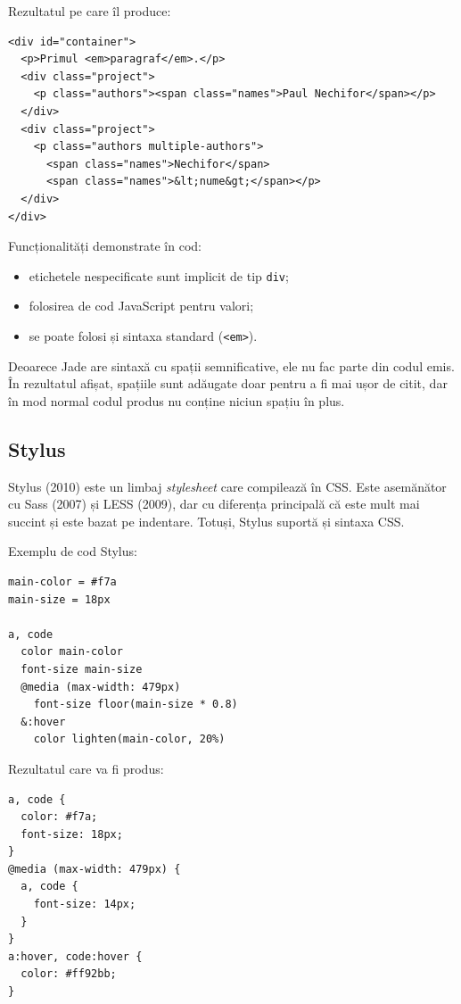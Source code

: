 \documentclass[a4wide,12pt]{report}
\newcommand{\eng}[1]{\emph{#1}} %
\newcommand{\cod}[1]{\texttt{#1}}
\newcommand{\acr}[1]{{\textsmaller[1]{\textsc{#1}}}} %
\begin{document}
Rezultatul pe care îl produce:

\begin{verbatim}
<div id="container">
  <p>Primul <em>paragraf</em>.</p>
  <div class="project">
    <p class="authors"><span class="names">Paul Nechifor</span></p>
  </div>
  <div class="project">
    <p class="authors multiple-authors">
      <span class="names">Nechifor</span>
      <span class="names">&lt;nume&gt;</span></p>
  </div>
</div>
\end{verbatim}

Funcționalități demonstrate în cod:

\begin{itemize}

\item etichetele nespecificate sunt implicit de tip \cod{div};

\item folosirea de cod JavaScript pentru valori;

\item se poate folosi și sintaxa \acr{HTML} standard (\cod{<em>}).

\end{itemize}

Deoarece Jade are sintaxă cu spații semnificative, ele nu fac parte din codul
emis. În rezultatul afișat, spațiile sunt adăugate doar pentru a fi mai ușor
de citit, dar în mod normal codul produs nu conține niciun spațiu în plus.

\subsection{Stylus}

Stylus (2010) este un limbaj \eng{stylesheet} care compilează în CSS. Este
asemănător cu Sass (2007) și LESS (2009), dar cu diferența principală că este
mult mai succint și este bazat pe indentare. Totuși, Stylus suportă și sintaxa
CSS.

Exemplu de cod Stylus:

\begin{verbatim}
main-color = #f7a
main-size = 18px

a, code
  color main-color
  font-size main-size
  @media (max-width: 479px)
    font-size floor(main-size * 0.8)
  &:hover
    color lighten(main-color, 20%)
\end{verbatim}

Rezultatul care va fi produs:

\begin{verbatim}
a, code {
  color: #f7a;
  font-size: 18px;
}
@media (max-width: 479px) {
  a, code { 
    font-size: 14px;
  }
}
a:hover, code:hover {
  color: #ff92bb;
}
\end{verbatim}
\end{document}
